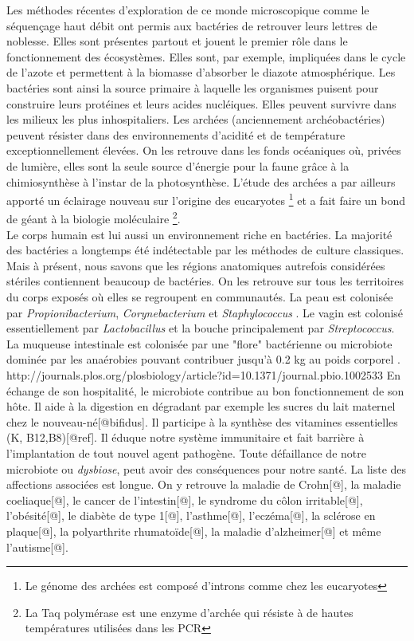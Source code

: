 \documentclass[12pt,a4paper]{article}
\begin{document}
Les méthodes récentes d'exploration de ce monde microscopique comme le séquençage haut débit ont permis aux bactéries de retrouver leurs lettres de noblesse.
Elles sont présentes partout et jouent le premier rôle dans le fonctionnement des écosystèmes. Elles sont, par exemple, impliquées dans le cycle de l'azote et permettent à la biomasse d'absorber le diazote atmosphérique. Les bactéries sont ainsi la source primaire à laquelle les organismes puisent pour construire leurs protéines et leurs acides nucléiques.
Elles peuvent survivre dans les milieux les plus inhospitaliers. Les archées (anciennement archéobactéries) peuvent résister dans des environnements d'acidité et de température exceptionnellement élevées. On les retrouve dans les fonds océaniques où, privées de lumière, elles sont la seule source d'énergie pour la faune grâce à la chimiosynthèse à l'instar de la photosynthèse. L'étude des archées a par ailleurs apporté un éclairage nouveau sur l’origine des eucaryotes \footnote{Le génome des archées est composé d'introns comme chez les eucaryotes} et a fait faire un bond de géant à la biologie moléculaire \footnote{La Taq polymérase est une enzyme d'archée qui résiste à de hautes températures utilisées dans les PCR}.\\
Le corps humain est lui aussi un environnement riche en bactéries. La majorité des bactéries a longtemps été indétectable par les méthodes de culture classiques. Mais à présent, nous savons que les régions anatomiques autrefois considérées stériles contiennent beaucoup de bactéries. 
On les retrouve sur tous les territoires du corps exposés où elles se regroupent en communautés.
La peau est colonisée par \textit{Propionibacterium}, \textit{Corynebacterium} et \textit{Staphylococcus} \citep{Beck}. Le vagin est colonisé essentiellement par \textit{Lactobacillus} et la bouche principalement par \textit{Streptococcus}\cite{Beck}.
La muqueuse intestinale est colonisée par une "flore" bactérienne ou microbiote dominée par les anaérobies pouvant contribuer jusqu'à 0.2 kg au poids corporel \citep{Beck}. http://journals.plos.org/plosbiology/article?id=10.1371/journal.pbio.1002533
En échange de son hospitalité, le microbiote contribue au bon fonctionnement de son hôte. Il aide à la digestion en dégradant par exemple les sucres du lait maternel chez le nouveau-né[@bifidus]. Il participe à la synthèse des vitamines essentielles (K, B12,B8)[@ref]. Il éduque notre système immunitaire et fait barrière à l'implantation de tout nouvel agent pathogène.
Toute défaillance de notre microbiote ou \textit{dysbiose}, peut avoir des conséquences pour notre santé. La liste des affections associées est longue. On y retrouve la maladie de Crohn[@], la maladie coeliaque[@], le cancer de l’intestin[@], le syndrome du côlon irritable[@], l’obésité[@], le diabète de type 1[@], l’asthme[@], l’eczéma[@], la sclérose en plaque[@], la polyarthrite rhumatoïde[@], la maladie d’alzheimer[@] et même l’autisme[@]. \\
\end{document}
